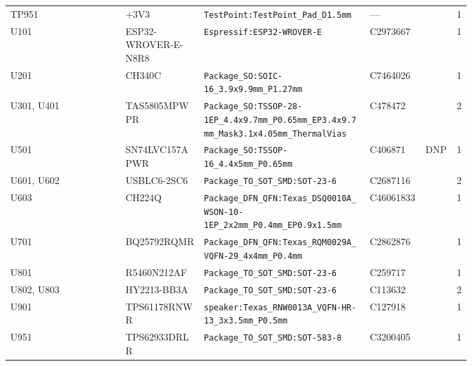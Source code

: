 {\begin{longtable}{@{}>{\raggedright\arraybackslash}p{0.25\linewidth}>{\raggedright\arraybackslash}p{0.17\linewidth}>{\raggedright\arraybackslash}p{0.36\linewidth}l l r@{}}
TP951 & +3V3 & \texttt{TestPoint:\allowbreak{}TestPoint\_\allowbreak{}Pad\_\allowbreak{}D1.5mm} & --- &  & 1\\
U101 & ESP32-WROVER-E-N8R8 & \texttt{Espressif:\allowbreak{}ESP32-WROVER-E} & C2973667 &  & 1\\
U201 & CH340C & \texttt{Package\_\allowbreak{}SO:\allowbreak{}SOIC-16\_\allowbreak{}3.9x9.9mm\_\allowbreak{}P1.27mm} & C7464026 &  & 1\\
U301, U401 & TAS5805MPWPR & \texttt{Package\_\allowbreak{}SO:\allowbreak{}TSSOP-28-1EP\_\allowbreak{}4.4x9.7mm\_\allowbreak{}P0.65mm\_\allowbreak{}EP3.4x9.7mm\_\allowbreak{}Mask3.1x4.05mm\_\allowbreak{}ThermalVias} & C478472 &  & 2\\
U501 & SN74LVC157APWR & \texttt{Package\_\allowbreak{}SO:\allowbreak{}TSSOP-16\_\allowbreak{}4.4x5mm\_\allowbreak{}P0.65mm} & C406871 & DNP & 1\\
U601, U602 & USBLC6-2SC6 & \texttt{Package\_\allowbreak{}TO\_\allowbreak{}SOT\_\allowbreak{}SMD:\allowbreak{}SOT-23-6} & C2687116 &  & 2\\
U603 & CH224Q & \texttt{Package\_\allowbreak{}DFN\_\allowbreak{}QFN:\allowbreak{}Texas\_\allowbreak{}DSQ0010A\_\allowbreak{}WSON-10-1EP\_\allowbreak{}2x2mm\_\allowbreak{}P0.4mm\_\allowbreak{}EP0.9x1.5mm} & C46061833 &  & 1\\
U701 & BQ25792RQMR & \texttt{Package\_\allowbreak{}DFN\_\allowbreak{}QFN:\allowbreak{}Texas\_\allowbreak{}RQM0029A\_\allowbreak{}VQFN-29\_\allowbreak{}4x4mm\_\allowbreak{}P0.4mm} & C2862876 &  & 1\\
U801 & R5460N212AF & \texttt{Package\_\allowbreak{}TO\_\allowbreak{}SOT\_\allowbreak{}SMD:\allowbreak{}SOT-23-6} & C259717 &  & 1\\
U802, U803 & HY2213-BB3A & \texttt{Package\_\allowbreak{}TO\_\allowbreak{}SOT\_\allowbreak{}SMD:\allowbreak{}SOT-23-6} & C113632 &  & 2\\
U901 & TPS61178RNWR & \texttt{speaker:\allowbreak{}Texas\_\allowbreak{}RNW0013A\_\allowbreak{}VQFN-HR-13\_\allowbreak{}3x3.5mm\_\allowbreak{}P0.5mm} & C127918 &  & 1\\
U951 & TPS62933DRLR & \texttt{Package\_\allowbreak{}TO\_\allowbreak{}SOT\_\allowbreak{}SMD:\allowbreak{}SOT-583-8} & C3200405 &  & 1\\
\end{longtable}
}
